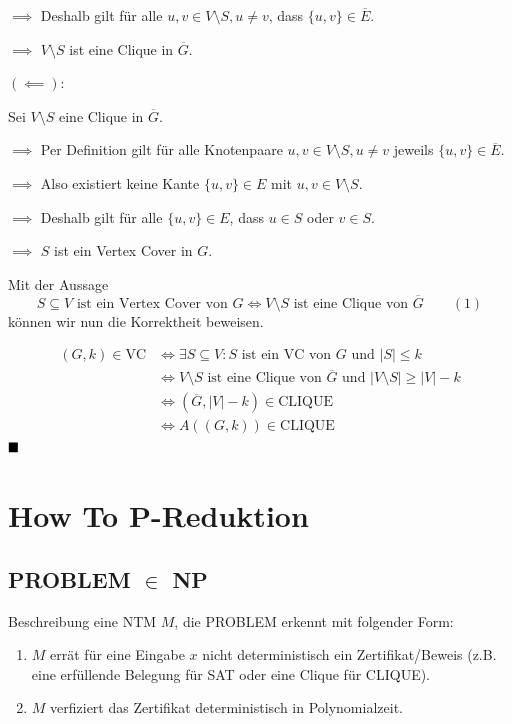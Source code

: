 \documentclass[a4paper, 11pt]{article}
\begin{document}
	
	$\implies$ Deshalb gilt für alle $u, v \in V \setminus S, u \neq v$, dass $\{u, v\} \in \overline{E}$. 
		
	
	$\implies$ $V \setminus S$ ist eine Clique in $\overline{G}$.


	$\mathbf{(\impliedby):}$

	Sei $V\setminus S$ eine Clique in $\overline{G}$. 
	
	
	$\implies$ Per Definition gilt für alle Knotenpaare $u, v \in V\setminus S, u \neq v$ jeweils $\{u, v\} \in \overline{E}$.
		
	
	$\implies$ Also existiert keine Kante $\{u, v\} \in E$ mit $u, v \in V\setminus S$.

	
	$\implies$ Deshalb gilt für alle $\{u, v\} \in E$, dass $u \in S$ oder $v \in S$. 
		
	
	$\implies$ $S$ ist ein Vertex Cover in $G$.
	
	Mit der Aussage 
	$$S \subseteq V \text{ ist ein Vertex Cover von }G \iff V\setminus S \text{ ist eine Clique von } \overline{G} \qquad (1)$$
	können wir nun die Korrektheit beweisen.
	
	\begin{align*}
		(G, k) \in \text{VC} &\iff \exists S \subseteq V: S \text{ ist ein VC von } G \text{ und } |S| \leq k\\
		&\iff V\setminus S \text{ ist eine Clique von } \overline{G} \text{ und } |V\setminus S| \geq |V| - k\\
		&\iff (\overline{G}, |V| - k) \in \text{CLIQUE}\\
		&\iff A((G, k)) \in \text{CLIQUE}
	\end{align*}
	$\hfill\blacksquare$


\section{How To P-Reduktion}

\subsection{PROBLEM $\in $ NP}
	Beschreibung eine NTM $M$, die PROBLEM erkennt mit folgender Form:
	
	\begin{enumerate}[label=\arabic*.]
		\item $M$ errät für eine Eingabe $x$ nicht deterministisch ein Zertifikat/Beweis (z.B. eine erfüllende Belegung für SAT oder eine Clique für CLIQUE). 
		
		\item $M$ verfiziert das Zertifikat deterministisch in Polynomialzeit.
	\end{enumerate}
	
\end{document}
